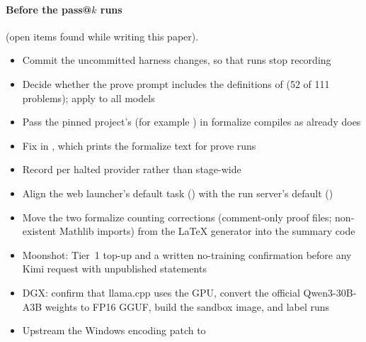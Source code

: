 \documentclass[11pt,a4paper]{article}
\newcommand{\pending}{\ensuremath{\square}}
\begin{document}
\paragraph{Before the pass@$k$ runs} (open items found while writing this paper).
\begin{itemize}[label=\pending]
\item Commit the uncommitted harness changes, so that runs stop recording 
\item Decide whether the prove prompt includes the definitions of  (52 of 111 problems); apply to all models
\item Pass the pinned project's  (for example ) in formalize compiles as  already does
\item Fix  in , which prints the formalize text for prove runs
\item Record  per halted provider rather than stage-wide
\item Align the web launcher's default task () with the run server's default ()
\item Move the two formalize counting corrections (comment-only proof files; non-existent Mathlib imports) from the LaTeX generator into the summary code
\item Moonshot: Tier~1 top-up and a written no-training confirmation before any Kimi request with unpublished statements
\item DGX: confirm that llama.cpp uses the GPU, convert the official Qwen3-30B-A3B weights to FP16 GGUF, build the sandbox image, and label runs 
\item Upstream the Windows  encoding patch to 
\end{itemize}
\end{document}
